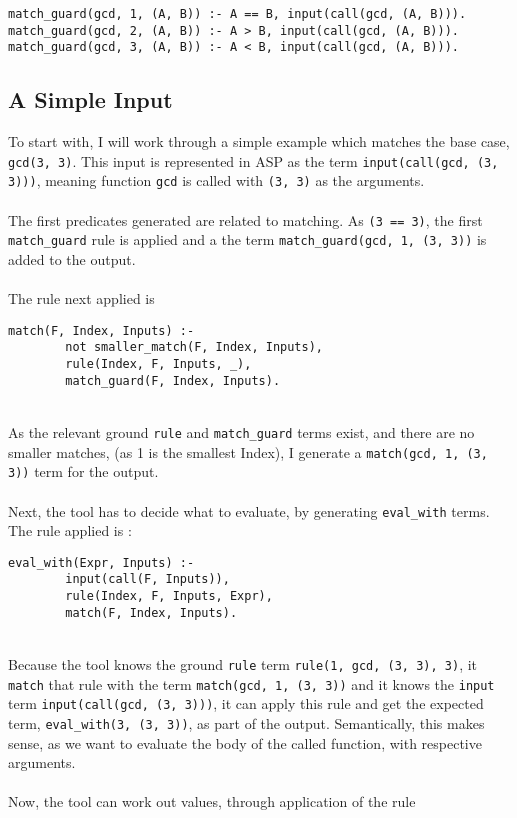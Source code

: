 \begin{lstlisting}
match_guard(gcd, 1, (A, B)) :- A == B, input(call(gcd, (A, B))).
match_guard(gcd, 2, (A, B)) :- A > B, input(call(gcd, (A, B))).
match_guard(gcd, 3, (A, B)) :- A < B, input(call(gcd, (A, B))).
\end{lstlisting}

\subsection{A Simple Input}
To start with, I will work through a simple example which matches the base case, \lstinline{gcd(3, 3)}. This input is represented in ASP as the term \lstinline{input(call(gcd, (3, 3)))}, meaning function \lstinline{gcd} is called with \lstinline{(3, 3)} as the arguments. \\ \\
The first predicates generated are related to matching. As \lstinline{(3 == 3)}, the first \lstinline{match_guard} rule is applied and a the term \lstinline{match_guard(gcd, 1, (3, 3))} is added to the output.\\ \\ %
The rule next applied is \\

\begin{lstlisting}[firstnumber=197]
match(F, Index, Inputs) :- 
		not smaller_match(F, Index, Inputs), 
		rule(Index, F, Inputs, _), 
		match_guard(F, Index, Inputs).
\end{lstlisting}
\mbox{} \\
As the relevant ground \lstinline{rule} and \lstinline{match_guard} terms exist, and there are no smaller matches, (as 1 is the smallest Index), I generate a \lstinline{match(gcd, 1, (3, 3))} term for the output. \\ \\ %
Next, the tool has to decide what to evaluate, by generating \lstinline{eval_with} terms. The rule applied is :\\ %

\begin{lstlisting}[firstnumber=128]
eval_with(Expr, Inputs) :- 
		input(call(F, Inputs)), 
		rule(Index, F, Inputs, Expr), 
		match(F, Index, Inputs).
\end{lstlisting}
\mbox{} \\
Because the tool knows the ground \lstinline{rule} term \lstinline{rule(1, gcd, (3, 3), 3)}, it \lstinline{match} that rule with the term \lstinline{match(gcd, 1, (3, 3))} and it knows the \lstinline{input} term \lstinline{input(call(gcd, (3, 3)))}, it can apply this rule and get the expected term, \lstinline{eval_with(3, (3, 3))}, as part of the output. Semantically, this makes sense, as we want to evaluate the body of the called function, with respective arguments. \\ \\%
Now, the tool can work out values, through application of the rule \\

